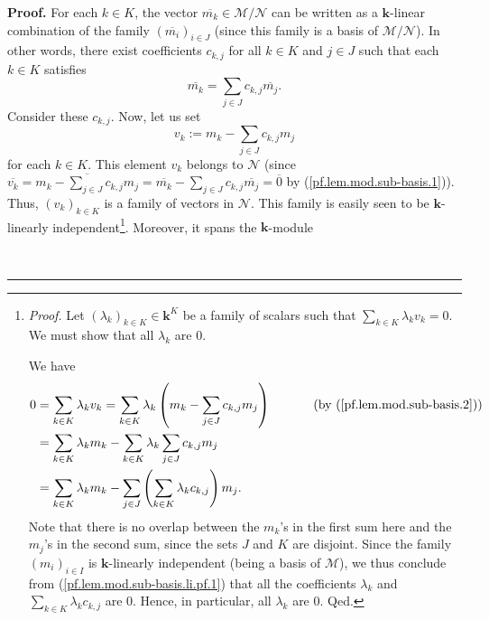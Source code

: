 \documentclass[numbers=enddot,12pt,final,onecolumn,notitlepage]{scrartcl}%
\numberwithin{exer}{subsection}
\theoremstyle{definition}
\newenvironment{proof}[1][Proof]{\noindent\textbf{#1.} }{\ \rule{0.5em}{0.5em}}
\let\sumnonlimits\sum
\renewcommand{\sum}{\sumnonlimits\limits}
\begin{document}
\begin{proof}
For each $k\in K$, the vector $\overline{m_{k}}\in\mathcal{M}/\mathcal{N}$ can
be written as a $\mathbf{k}$-linear combination of the family $\left(
\overline{m_{i}}\right)  _{i\in J}$ (since this family is a basis of
$\mathcal{M}/\mathcal{N}$). In other words, there exist coefficients $c_{k,j}$
for all $k\in K$ and $j\in J$ such that each $k\in K$ satisfies%
\begin{equation}
\overline{m_{k}}=\sum_{j\in J}c_{k,j}\overline{m_{j}}.
\label{pf.lem.mod.sub-basis.1}%
\end{equation}
Consider these $c_{k,j}$. Now, let us set%
\begin{equation}
v_{k}:=m_{k}-\sum_{j\in J}c_{k,j}m_{j} \label{pf.lem.mod.sub-basis.2}%
\end{equation}
for each $k\in K$. This element $v_{k}$ belongs to $\mathcal{N}$ (since
$\overline{v_{k}}=\overline{m_{k}-\sum_{j\in J}c_{k,j}m_{j}}=\overline{m_{k}%
}-\sum_{j\in J}c_{k,j}\overline{m_{j}}=\overline{0}$ by
(\ref{pf.lem.mod.sub-basis.1})). Thus, $\left(  v_{k}\right)  _{k\in K}$ is a
family of vectors in $\mathcal{N}$. This family is easily seen to be
$\mathbf{k}$-linearly independent\footnote{\textit{Proof.} Let $\left(
\lambda_{k}\right)  _{k\in K}\in\mathbf{k}^{K}$ be a family of scalars such
that $\sum_{k\in K}\lambda_{k}v_{k}=0$. We must show that all $\lambda_{k}$
are $0$.
\par
We have%
\begin{align}
0  &  =\sum_{k\in K}\lambda_{k}v_{k}=\sum_{k\in K}\lambda_{k}\left(
m_{k}-\sum_{j\in J}c_{k,j}m_{j}\right)  \ \ \ \ \ \ \ \ \ \ \left(  \text{by
(\ref{pf.lem.mod.sub-basis.2})}\right) \nonumber\\
&  =\sum_{k\in K}\lambda_{k}m_{k}-\sum_{k\in K}\lambda_{k}\sum_{j\in J}%
c_{k,j}m_{j}\nonumber\\
&  =\sum_{k\in K}\lambda_{k}m_{k}-\sum_{j\in J}\left(  \sum_{k\in K}%
\lambda_{k}c_{k,j}\right)  m_{j}. \label{pf.lem.mod.sub-basis.li.pf.1}%
\end{align}
Note that there is no overlap between the $m_{k}$'s in the first sum here and
the $m_{j}$'s in the second sum, since the sets $J$ and $K$ are disjoint.
Since the family $\left(  m_{i}\right)  _{i\in I}$ is $\mathbf{k}$-linearly
independent (being a basis of $\mathcal{M}$), we thus conclude from
(\ref{pf.lem.mod.sub-basis.li.pf.1}) that all the coefficients $\lambda_{k}$
and $\sum_{k\in K}\lambda_{k}c_{k,j}$ are $0$. Hence, in particular, all
$\lambda_{k}$ are $0$. Qed.}. Moreover, it spans the $\mathbf{k}$-module

\end{proof}
\end{document}
